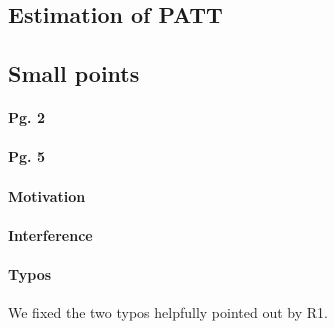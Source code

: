 \documentclass[hidelinks,12pt,letterpaper]{article}
\begin{document}
\subsection{Estimation of PATT}

\subsection{Small points}

\paragraph*{Pg. 2}

\paragraph*{Pg. 5}


\paragraph*{Motivation}

\paragraph*{Interference}

\paragraph*{Typos}
We fixed the two typos helpfully pointed out by R1. 
\end{document}
